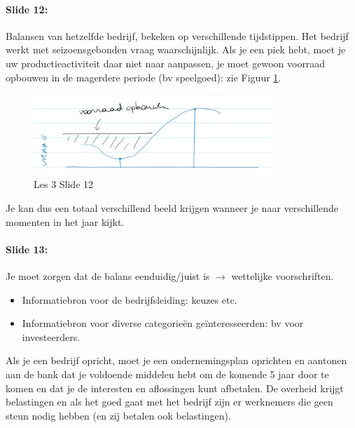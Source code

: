 \documentclass[10pt,a4paper]{report}
\begin{document}
\paragraph{Slide 12:} Balansen van hetzelfde bedrijf, bekeken op verschillende tijdstippen. Het bedrijf werkt met seizoensgebonden vraag waarschijnlijk. Als je een piek hebt, moet je uw productieactiviteit daar niet naar aanpassen, je moet gewoon voorraad opbouwen in de magerdere periode (bv speelgoed): zie Figuur \ref{les03_02}.

\begin{figure}[h!]
\centering
\includegraphics[width=90mm]{Les03_02.png}
\caption{Les 3 Slide 12} 
\label{les03_02}
\end{figure}

Je kan dus een totaal verschillend beeld krijgen wanneer je naar verschillende momenten in het jaar kijkt. 

\paragraph{Slide 13:} Je moet zorgen dat de balans eenduidig/juist is $\rightarrow$ wettelijke voorschriften.
\begin{itemize}
\item Informatiebron voor de bedrijfsleiding: keuzes etc.
\item Informatiebron voor diverse categorie\"en ge\"interesseerden: bv voor investeerders.
\end{itemize}
Als je een bedrijf opricht, moet je een ondernemingsplan oprichten en aantonen aan de bank dat je voldoende middelen hebt om de komende 5 jaar door te komen en dat je de interesten en aflossingen kunt afbetalen.
De overheid krijgt belastingen en als het goed gaat met het bedrijf zijn er werknemers die geen steun nodig hebben (en zij betalen ook belastingen).
\end{document}
